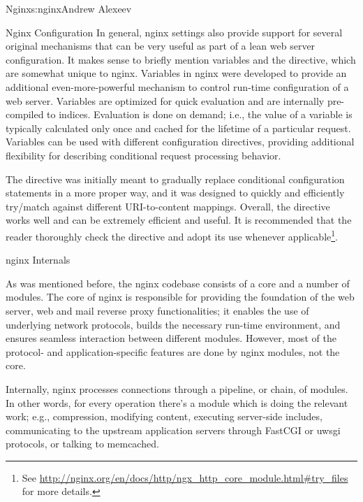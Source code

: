 \begin{aosachapter}{Nginx}{s:nginx}{Andrew Alexeev}
\begin{aosasect1}{Nginx Configuration}
In general, nginx settings also provide support for several original
mechanisms that can be very useful as part of a lean web server
configuration. It makes sense to briefly mention variables and the
 directive, which are somewhat unique to
nginx. Variables in nginx were developed to provide an additional 
even-more-powerful mechanism to control run-time configuration of a web
server. Variables are optimized for quick evaluation and are
internally pre-compiled to indices. Evaluation is done on demand;
i.e., the value of a variable is typically calculated only once and
cached for the lifetime of a particular request. Variables can be used
with different configuration directives, providing additional
flexibility for describing conditional request processing
behavior. 

The  directive was initially meant to
gradually replace conditional  configuration statements in a
more proper way, and it was designed to quickly and efficiently
try/match against different URI-to-content mappings. Overall, the
 directive works well and can be extremely efficient
and useful. It is recommended that the reader thoroughly check the
 directive and adopt its use whenever
applicable\footnote{See
  \url{http://nginx.org/en/docs/http/ngx_http_core_module.html#try_files}
  for more details.}.

\end{aosasect1}

\begin{aosasect1}{nginx Internals} \label{sec.nginx.internals}

As was mentioned before, the nginx codebase consists of a core and a
number of modules. The core of nginx is responsible for providing the
foundation of the web server, web and mail reverse proxy
functionalities; it enables the use of underlying network protocols,
builds the necessary run-time environment, and ensures seamless
interaction between different modules. However, most of the protocol-
and application-specific features are done by nginx modules, not the
core.

Internally, nginx processes connections through a pipeline, or chain,
of modules. In other words, for every operation there's a module which
is doing the relevant work; e.g., compression, modifying content,
executing server-side includes, communicating to the upstream
application servers through FastCGI or uwsgi protocols, or talking to
memcached.


\end{aosasect1}
\end{aosachapter}
